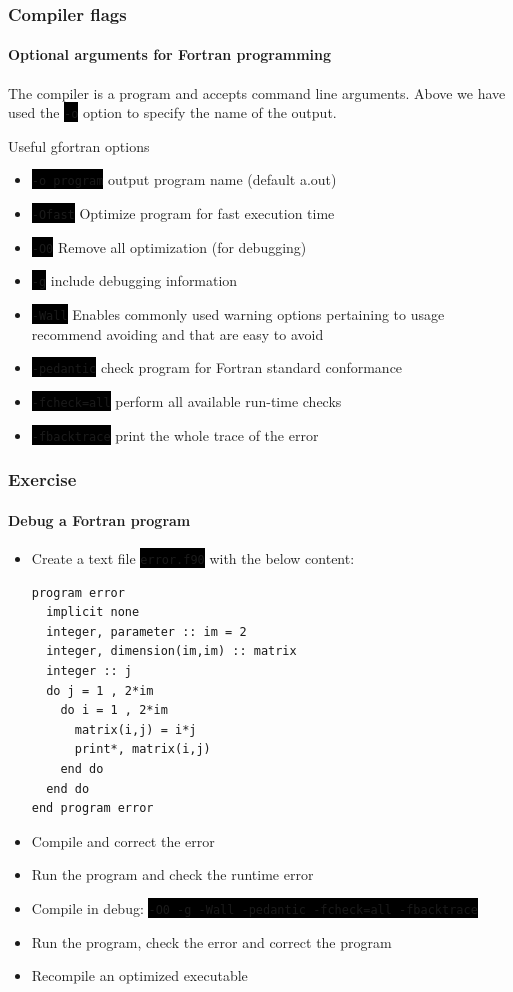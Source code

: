 \documentclass[unknownkeysallowed, 10pt, a4 paper, handout]{beamer}
\newcommand{\code}[1]{\colorbox{black}{\color{green}\texttt{#1}}}
\begin{document}
\begin{frame}[label=compiler]
  \frametitle{Compiler flags}
  \framesubtitle{Optional arguments for Fortran programming}
  The compiler is a program and accepts command line arguments. Above we
    have used the \code{-o} option to specify the name of the output.
  \begin{block}{Useful gfortran options}
    \begin{itemize}
        \item \code{-o program} output program name (default a.out)
      \item \code{-Ofast} Optimize program for fast execution time
      \item \code{-O0} Remove all optimization (for debugging)
      \item \code{-g} include debugging information
      \item \code{-Wall} Enables commonly used warning options pertaining to
          usage recommend avoiding and that are easy to avoid
      \item \code{-pedantic} check program for Fortran standard conformance
      \item \code{-fcheck=all} perform all available run-time checks
      \item \code{-fbacktrace} print the whole trace of the error
  \end{itemize}
  \end{block}
\end{frame}


\begin{frame}[label=exercise2, fragile=singleslide]
  \frametitle{Exercise}
  \framesubtitle{Debug a Fortran program}
  \begin{itemize}
    \item Create a text file \code{error.f90} with the below content:
      \footnotesize{
      \begin{verbatim}
program error
  implicit none
  integer, parameter :: im = 2
  integer, dimension(im,im) :: matrix
  integer :: j
  do j = 1 , 2*im
    do i = 1 , 2*im
      matrix(i,j) = i*j
      print*, matrix(i,j)
    end do
  end do
end program error
      \end{verbatim}
      }
    \item Compile and correct the error
    \item Run the program and check the runtime error
    \item Compile in debug:
        \code{-O0 -g -Wall -pedantic -fcheck=all -fbacktrace}
    \item Run the program, check the error and correct the program
    \item Recompile an optimized executable
  \end{itemize}
\end{frame}
\end{document}
